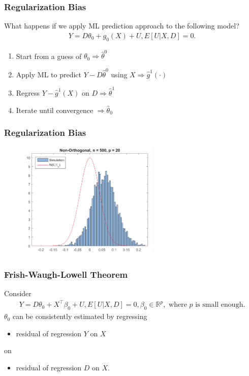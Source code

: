 \documentclass[aspectratio=169, 12pt]{beamer}
\newcommand{\R}{\mathbb{R}}
\begin{document}
	\begin{frame}
	\frametitle{Regularization Bias}
	What happens if we apply ML prediction approach to the following model?
	\begin{eqnarray*}
	Y = D\theta_0 + g_0(X) + U, E[U|X,D]=0.
	\end{eqnarray*}
	\begin{enumerate}
	\item Start from a guess of $\theta_0 \Rightarrow \hat{\theta}^0 $
	\item Apply ML to predict $Y-D\hat{\theta}^0 $ using $X \Rightarrow \hat{g}^1(\cdot) $
	\item Regress $Y-\hat{g}^1(X) $ on $D \Rightarrow \hat{\theta}^1 $
	\item Iterate until convergence $\Rightarrow \hat{\theta}_0 $
	\end{enumerate}
	
	\end{frame}

	\begin{frame}
	\frametitle{Regularization Bias}
	\begin{figure}
	\includegraphics[width=0.6\textwidth]{fig/fig1a.png}
	\end{figure}

	\end{frame}
	
	\begin{frame}
	\frametitle{Frish-Waugh-Lowell Theorem}
	Consider
	\begin{eqnarray*}
	Y = D\theta_0 + X^\top \beta_0 + U, E[U|X,D]=0, \beta_0 \in \R^p, \text{ where } p \text{ is small enough.}
	\end{eqnarray*}
	$\theta_0$ can be consistently estimated by regressing
	\begin{itemize}
	\item residual of regression $Y$ on $X$
	\end{itemize}
	on
	\begin{itemize}
	\item residual of regression $D$ on $X$.
	\end{itemize}

	\end{frame}
\end{document}
